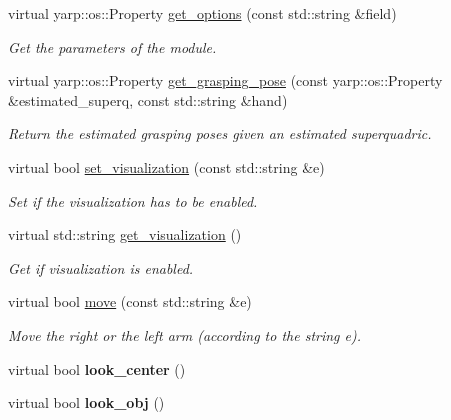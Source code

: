 \begin{DoxyCompactItemize}
virtual yarp\+::os\+::\+Property \hyperlink{classsuperquadricGrasp__IDL_a4799064cf16a52762787c0b245318d54}{get\+\_\+options} (const std\+::string \&field)
\begin{DoxyCompactList}\small\item\em Get the parameters of the module. \end{DoxyCompactList}\item 
virtual yarp\+::os\+::\+Property \hyperlink{classsuperquadricGrasp__IDL_a595e98ed2a8fca7ac707b71f97d626d1}{get\+\_\+grasping\+\_\+pose} (const yarp\+::os\+::\+Property \&estimated\+\_\+superq, const std\+::string \&hand)
\begin{DoxyCompactList}\small\item\em Return the estimated grasping poses given an estimated superquadric. \end{DoxyCompactList}\item 
virtual bool \hyperlink{classsuperquadricGrasp__IDL_a91d43de48ad97e35205010c7510e503c}{set\+\_\+visualization} (const std\+::string \&e)
\begin{DoxyCompactList}\small\item\em Set if the visualization has to be enabled. \end{DoxyCompactList}\item 
virtual std\+::string \hyperlink{classsuperquadricGrasp__IDL_ad108d67db8f389b630fa2b0caed87ca5}{get\+\_\+visualization} ()
\begin{DoxyCompactList}\small\item\em Get if visualization is enabled. \end{DoxyCompactList}\item 
virtual bool \hyperlink{classsuperquadricGrasp__IDL_aa996e476a845b484542c7a596cc1f02a}{move} (const std\+::string \&e)
\begin{DoxyCompactList}\small\item\em Move the right or the left arm (according to the string e). \end{DoxyCompactList}\item 
virtual bool {\bfseries look\+\_\+center} ()\label{classsuperquadricGrasp__IDL_a2f9efa6904f4e7240456a4968f3f6c07}

\item 
virtual bool {\bfseries look\+\_\+obj} ()\label{classsuperquadricGrasp__IDL_ad583966fde84372bad2b65214dcbe2bc}


\end{DoxyCompactItemize}
